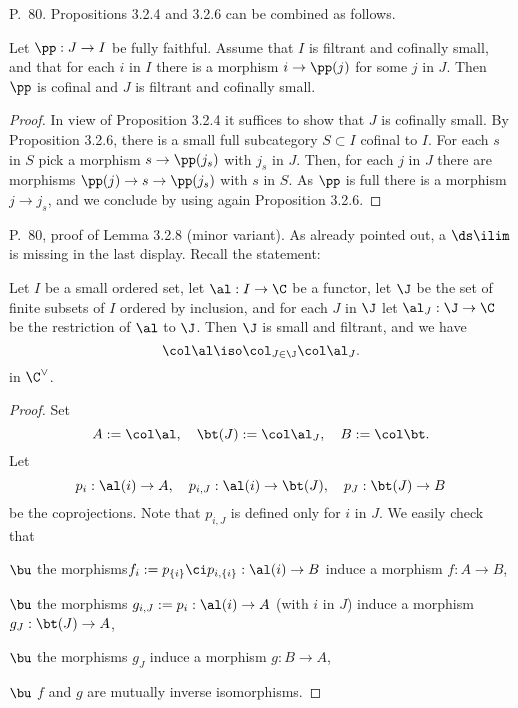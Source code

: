 \documentclass[12pt]{article}
\theoremstyle{remark}
\theoremstyle{definition}
\begin{document}
\begin{s} 
P.~80. Propositions 3.2.4 and 3.2.6 can be combined as follows. 

\begin{prop}
Let $\pp:J\to I$ be fully faithful. Assume that $I$ is filtrant and cofinally small, and that for each $i$ in $I$ there is a morphism $i\to\pp(j)$ for some $j$ in $J$. Then $\pp$ is cofinal and $J$ is filtrant and cofinally small. 
\end{prop} 

\begin{proof}
In view of Proposition 3.2.4 it suffices to show that $J$ is cofinally small. By Proposition 3.2.6, there is a small full subcategory $S\subset I$ cofinal to $I$. For each $s$ in $S$ pick a morphism $s\to\pp(j_s)$ with $j_s$ in $J$. Then, for each $j$ in $J$ there are morphisms $\pp(j)\to s\to\pp(j_s)$ with $s$ in $S$. As $\pp$ is full there is a morphism $j\to j_s$, and we conclude by using again Proposition 3.2.6.
\end{proof}
\end{s}

%

\begin{s} 
P.~80, proof of Lemma 3.2.8 (minor variant). As already pointed out, a $\ds\ilim$ is missing in the last display. Recall the statement:
\begin{lem}
Let $I$ be a small ordered set, let $\al:I\to\C$ be a functor, let $\J$ be the set of finite subsets of $I$ ordered by inclusion, and for each $J$ in $\J$ let $\al_J:\J\to\C$ be the restriction of $\al$ to $\J$. Then $\J$ is small and filtrant, and we have
$$
\col\al\iso\col_{J\in\J}\col\al_J.
$$ 
in $\C^\vee$.
\end{lem}
\begin{proof}
Set
$$
A:=\col\al,\quad
\bt(J):=\col\al_J,\quad
B:=\col\bt.
$$
Let 
$$
p_i:\al(i)\to A,\quad 
p_{i,J}:\al(i)\to\bt(J),\quad 
p_J:\bt(J)\to B
$$
be the coprojections. Note that $p_{i,J}$ is defined only for $i$ in $J$. We easily check that 

\nn$\bu$ the morphisms$f_i:=p_{\{i\}}\ci p_{i,\{i\}}:\al(i)\to B$ induce a morphism $f:A\to B$, 

\nn$\bu$ the morphisms $g_{i,J}:=p_i:\al(i)\to A$ (with $i$ in $J$) induce a morphism $g_J:\bt(J)\to A$, 

\nn$\bu$ the morphisms $g_J$ induce a morphism $g:B\to A$, 

\nn$\bu$ $f$ and $g$ are mutually inverse isomorphisms.
\end{proof}
\end{s}
\end{document}

